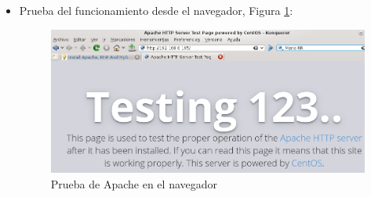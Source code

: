 \begin{itemize}
		\item Prueba del funcionamiento desde el navegador, Figura \ref{fig:figura32}:
		\begin{figure}[H] %
			\centering
			\includegraphics[scale=0.6]{figuras/figura32.png} 
			\caption{Prueba de Apache en el navegador} 
			\label{fig:figura32}
		\end{figure}
	\end{itemize}
			

\newpage

